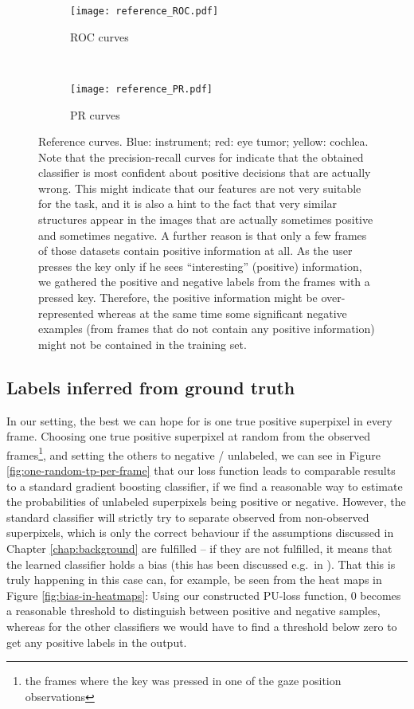 \begin{figure}[ht]
	\centering
	\begin{subfigure}[h]{0.45\textwidth}
	\texttt{[image: reference\_ROC.pdf]}	
		\caption*{ROC curves}
	\end{subfigure}
	~
	\begin{subfigure}[h]{0.45\textwidth}
	\texttt{[image: reference\_PR.pdf]}	
		\caption*{PR curves}
	\end{subfigure}
	\caption{Reference curves. Blue: instrument; red: eye tumor; yellow: cochlea. Note that the precision-recall curves for indicate that the obtained classifier is most confident about positive decisions that are actually wrong. This might indicate that our features are not very suitable for the task, and it is also a hint to the fact that very similar structures appear in the images that are actually sometimes positive and sometimes negative. A further reason is that only a few frames of those datasets contain positive information at all. As the user presses the key only if he sees ``interesting'' (positive) information, we gathered the positive and negative labels from the frames with a pressed key. Therefore, the positive information might be over-represented whereas at the same time some significant negative examples (from frames that do not contain any positive information) might not be contained in the training set.}
	\label{fig:reference-known-labels}
\end{figure}

\subsection{Labels inferred from ground truth}
In our setting, the best we can hope for is one true positive superpixel in every frame. Choosing one true positive superpixel at random from the observed frames\footnote{the frames where the key was pressed in one of the gaze position observations}, and setting the others to negative / unlabeled, we can see in Figure \ref{fig:one-random-tp-per-frame} that our loss function leads to comparable results to a standard gradient boosting classifier, if we find a reasonable way to estimate the probabilities  of unlabeled superpixels being positive or negative. 
However, the standard classifier will strictly try to separate observed from non-observed superpixels, which is only the correct behaviour if the assumptions discussed in Chapter \ref{chap:background} are fulfilled -- if they are not fulfilled, it means that the learned classifier holds a bias (this has been discussed e.g.\ in ). 
That this is truly happening in this case can, for example, be seen from the heat maps in Figure \ref{fig:bias-in-heatmaps}: Using our constructed PU-loss function, 0 becomes a reasonable threshold to distinguish between positive and negative samples, whereas for the other classifiers we would have to find a threshold below zero to get any positive labels in the output.

